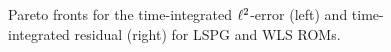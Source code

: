 \begin{figure}
\begin{center}
\begin{subfigure}[t]{0.49\textwidth}
\end{subfigure}
\caption{Pareto fronts for the time-integrated $\ell^2$-error (left) and time-integrated residual (right) for LSPG and WLS ROMs.} 
\label{fig:rom_swe_pareto}
\end{center}
\end{figure}

